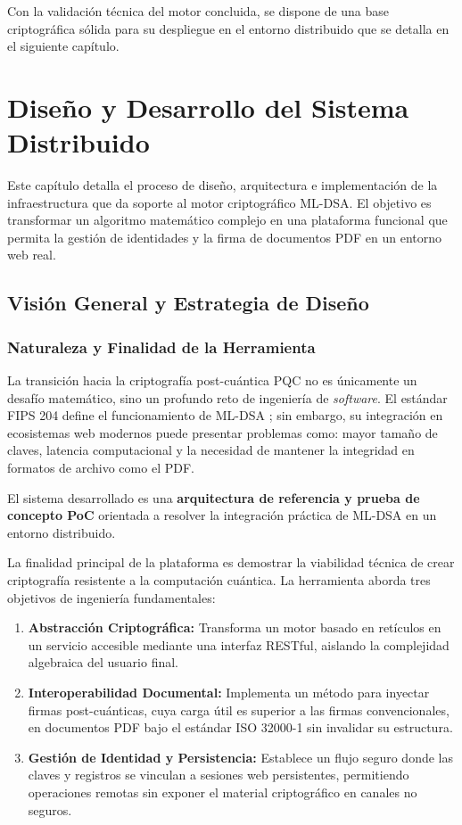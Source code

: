 \documentclass[11pt, a4paper]{report}
\theoremstyle{definition}
\begin{document}
Con la validación técnica del motor concluida, se dispone de una base criptográfica sólida para su despliegue en el entorno distribuido que se detalla en el siguiente capítulo.



\chapter{Diseño y Desarrollo del Sistema Distribuido}
\label{ch:desarrollo_sistema}

Este capítulo detalla el proceso de diseño, arquitectura e implementación de la infraestructura que da soporte al motor criptográfico ML-DSA. El objetivo es transformar un algoritmo matemático complejo en una plataforma funcional que permita la gestión de identidades y la firma de documentos PDF en un entorno web real.

\section{Visión General y Estrategia de Diseño}
\label{sec:vision_general_arquitectura}

\subsection{Naturaleza y Finalidad de la Herramienta}
\label{subsec:naturaleza_finalidad}

La transición hacia la criptografía post-cuántica PQC no es únicamente un desafío matemático, sino un profundo reto de ingeniería de \textit{software}. El estándar FIPS 204 define el funcionamiento de ML-DSA \cite{nist_fips204}; sin embargo, su integración en ecosistemas web modernos puede presentar problemas como: mayor tamaño de claves, latencia computacional y la necesidad de mantener la integridad en formatos de archivo como el PDF.

El sistema desarrollado es una \textbf{arquitectura de referencia y prueba de concepto PoC} orientada a resolver la integración práctica de ML-DSA en un entorno distribuido. 

La finalidad principal de la plataforma es demostrar la viabilidad técnica de crear criptografía resistente a la computación cuántica. La herramienta aborda tres objetivos de ingeniería fundamentales:

\begin{enumerate}
    \item \textbf{Abstracción Criptográfica:} Transforma un motor basado en retículos en un servicio accesible mediante una interfaz RESTful, aislando la complejidad algebraica del usuario final.
    \item \textbf{Interoperabilidad Documental:} Implementa un método para inyectar firmas post-cuánticas, cuya carga útil es superior a las firmas convencionales, en documentos PDF bajo el estándar ISO 32000-1 \cite{iso_pdf} sin invalidar su estructura.
    \item \textbf{Gestión de Identidad y Persistencia:} Establece un flujo seguro donde las claves y registros se vinculan a sesiones web persistentes, permitiendo operaciones remotas sin exponer el material criptográfico en canales no seguros.
\end{enumerate}
\end{document}
